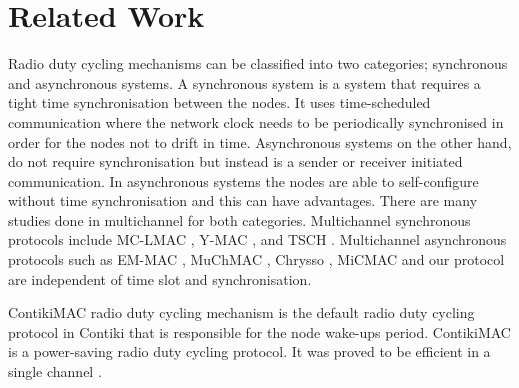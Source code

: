 \section{Related Work}
\label{sec:relatedwork}
Radio duty cycling mechanisms can be classified into two categories; synchronous and asynchronous systems. A synchronous system is a system that requires a tight time synchronisation between the nodes. It uses time-scheduled communication where the network clock needs to be periodically synchronised in order for the nodes not to drift in time. Asynchronous systems on the other hand, do not require synchronisation but instead is a sender or receiver initiated communication. In asynchronous systems the nodes are able to self-configure without time synchronisation and this can have advantages. There are many studies done in multichannel for both categories. Multichannel synchronous protocols include MC-LMAC \cite{mc-lmac}, Y-MAC \cite{y-mac}, and TSCH \cite{tsch}. Multichannel asynchronous protocols such as EM-MAC \cite{emmac}, MuChMAC \cite{muchmac}, Chrysso \cite{chrysso}, MiCMAC \cite{micmac} and our protocol are independent of time slot and synchronisation. 

ContikiMAC \cite{contikimac} radio duty cycling mechanism is the default radio duty cycling protocol in Contiki that is responsible for the node wake-ups period. ContikiMAC is a power-saving radio duty cycling protocol. It was proved to be efficient in a single channel \cite{micmac,orpl}. %

